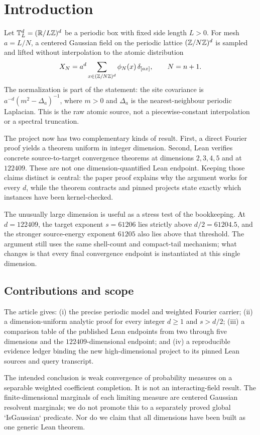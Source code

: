 \section{Introduction}\label{sec:intro}
Let $\mathbb T_L^d=(\mathbb R/L\mathbb Z)^d$ be a periodic box with fixed side length $L>0$. For mesh $a=L/N$, a centered Gaussian field on the periodic lattice $(\mathbb Z/N\mathbb Z)^d$ is sampled and lifted without interpolation to the atomic distribution
\[
 X_N=a^d\sum_{x\in(\mathbb Z/N\mathbb Z)^d}\phi_N(x)\,\delta_{[ax]},\qquad N=n+1.
\]
The normalization is part of the statement: the site covariance is $a^{-d}(m^2-\Delta_a)^{-1}$, where $m>0$ and $\Delta_a$ is the nearest-neighbour periodic Laplacian. This is the raw atomic source, not a piecewise-constant interpolation or a spectral truncation.

The project now has two complementary kinds of result. First, a direct Fourier proof yields a theorem uniform in integer dimension. Second, Lean verifies concrete source-to-target convergence theorems at dimensions $2,3,4,5$ and at $122409$. These are not one dimension-quantified Lean endpoint. Keeping those claims distinct is central: the paper proof explains why the argument works for every $d$, while the theorem contracts and pinned projects state exactly which instances have been kernel-checked.

The unusually large dimension is useful as a stress test of the bookkeeping. At $d=122409$, the target exponent $s=61206$ lies strictly above $d/2=61204.5$, and the stronger source-energy exponent $61205$ also lies above that threshold. The argument still uses the same shell-count and compact-tail mechanism; what changes is that every final convergence endpoint is instantiated at this single dimension.

\subsection{Contributions and scope}
The article gives: (i) the precise periodic model and weighted Fourier carrier; (ii) a dimension-uniform analytic proof for every integer $d\geq1$ and $s>d/2$; (iii) a comparison table of the published Lean endpoints from two through five dimensions and the $122409$-dimensional endpoint; and (iv) a reproducible evidence ledger binding the new high-dimensional project to its pinned Lean sources and query transcript.

The intended conclusion is weak convergence of probability measures on a separable weighted coefficient completion. It is not an interacting-field result. The finite-dimensional marginals of each limiting measure are centered Gaussian resolvent marginals; we do not promote this to a separately proved global `IsGaussian` predicate. Nor do we claim that all dimensions have been built as one generic Lean theorem.

